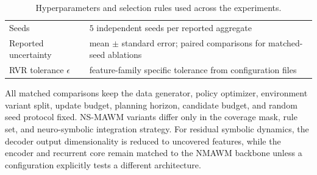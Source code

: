 \documentclass{article}
\theoremstyle{plain}
\theoremstyle{definition}
\theoremstyle{remark}
\begin{document}
\begin{table}[h!]
\begin{tabular}{ll}
    Seeds                     & $5$ independent seeds per reported aggregate                                             \\
    Reported uncertainty      & mean $\pm$ standard error; paired comparisons for matched-seed ablations                 \\
    RVR tolerance $\epsilon$  & feature-family specific tolerance from configuration files                               \\
    \bottomrule
  \end{tabular}
  \caption{Hyperparameters and selection rules used across the experiments.}
  \label{tab:hyperparameters_appendix}
\end{table}

All matched comparisons keep the data generator, policy optimizer, environment variant split, update budget, planning horizon, candidate budget, and random seed protocol fixed. NS-MAWM variants differ only in the coverage mask, rule set, and neuro-symbolic integration strategy. For residual symbolic dynamics, the decoder output dimensionality is reduced to uncovered features, while the encoder and recurrent core remain matched to the NMAWM backbone unless a configuration explicitly tests a different architecture.

\begin{table}[h!]
  \centering
  \footnotesize
  \caption{Compute-resource reporting template. Each run logs device type, wall-clock time, GPU memory, CPU usage, RAM usage, step time, and WM update time.}
  \label{tab:compute_resources_appendix}
\end{table}
\end{document}
